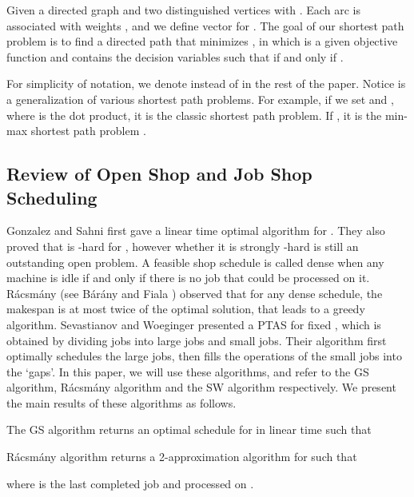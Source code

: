 \documentclass{llncs}
\numberwithin{subcase}{case}
\begin{document}
\begin{definition}
Given a directed graph  and two distinguished vertices  with . Each arc  is associated with  weights , and we define vector  for . The goal of our shortest path problem  is to find a  directed path  that minimizes , in which  is a given objective function and  contains the decision variables such that  if and only if .
\label{d_sp}
\end{definition}

For simplicity of notation, we denote  instead of  in the rest of the paper. Notice  is a generalization of various shortest path problems. For example, if we set  and , where  is the dot product, it is the classic shortest path problem. If , it is the min-max shortest path problem \cite{ABV06}.

\subsection{Review of Open Shop and Job Shop Scheduling}\label{sec_f2}
Gonzalez and Sahni \cite{Gonzalez1976} first gave a linear time optimal algorithm for . They also proved that  is -hard for , however whether it is strongly -hard is still an outstanding open problem. A feasible shop schedule is called dense when any machine is idle if and only if there is no job that could be processed on it. R{\'a}csm{\'a}ny (see B{\' a}r{\' a}ny and Fiala \cite{bt82}) observed that for any dense schedule, the makespan is at most twice of the optimal solution, that leads to a greedy algorithm. Sevastianov and Woeginger \cite{Sevastianov1998} presented a PTAS for fixed , which is obtained by dividing jobs into large jobs and small jobs. Their algorithm first  optimally schedules the large jobs, then fills the operations of the small jobs into the `gaps'. In this paper, we will use these algorithms, and refer to the GS algorithm, R{\'a}csm{\'a}ny algorithm and the SW algorithm respectively. We present the main results of these algorithms as follows.

\begin{theorem}
The GS algorithm returns an optimal schedule for  in linear time such that

\label{th_o_gs}
\end{theorem}
\begin{theorem}
R{\'a}csm{\'a}ny algorithm returns a 2-approximation algorithm for  such that

where  is the last completed job and processed on .\label{th_o_racsmany}
\end{theorem}
\end{document}
